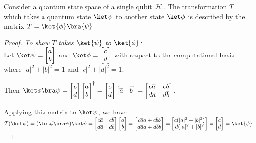 \begin{prop}
    Consider a quantum state space of a single qubit $\mathcal{H}$..
    The transformation $T$ which takes a quantum state $\ket\psi$ to another state $\ket\phi$ is described by the matrix $T = \ket{\phi}\bra{\psi}$
\end{prop}
\begin{proof}
    \emph{To show $T$ takes $\ket{\psi}$ to $\ket{\phi}$: }\\
    Let $\ket\psi = \begin{bmatrix} a \\ b \end{bmatrix}$ and $\ket\phi = \begin{bmatrix} c \\ d \end{bmatrix}$ with respect to the computational basis where $|a|^2 + |b|^2 = 1$ and $|c|^2 + |d|^2 = 1$.

        Then $\ket\phi \bra\psi = \begin{bmatrix} c \\ d \end{bmatrix}\begin{bmatrix} a \\ b \end{bmatrix}^\dagger = \begin{bmatrix} c \\ d \end{bmatrix} \begin{bmatrix} \overline{a} & \overline{b} \end{bmatrix} = \begin{bmatrix} c \overline{a} & c \overline{b} \\ d \overline{a} & d \overline{b} \end{bmatrix}$.

            Applying this matrix to $\ket\psi$, we have $T (\ket\psi) = (\ket\phi \bra\psi) \ket\psi =   \begin{bmatrix} c \overline{a} & c \overline{b} \\ d \overline{a} & d \overline{b} \end{bmatrix} \begin{bmatrix} a \\ b \end{bmatrix} = \begin{bmatrix} c \overline{a} a + c \overline{b} b \\ d \overline{a} a + d \overline{b} b\end{bmatrix} = \begin{bmatrix} c (|a|^2 + |b|^2) \\ d (|a|^2 + |b|^2 \end{bmatrix} = \begin{bmatrix} c \\ d \end{bmatrix} = \ket{\phi}$

\end{proof}


